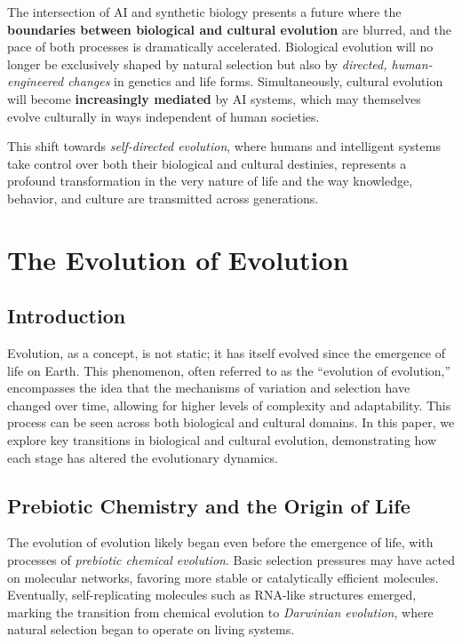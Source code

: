 \documentclass[12pt,titlepage]{book}
\begin{document}
The intersection of AI and synthetic biology presents a future where the \textbf{boundaries between biological and cultural evolution} are blurred, and the pace of both processes is dramatically accelerated. Biological evolution will no longer be exclusively shaped by natural selection but also by \textit{directed, human-engineered changes} in genetics and life forms. Simultaneously, cultural evolution will become \textbf{increasingly mediated} by AI systems, which may themselves evolve culturally in ways independent of human societies.

This shift towards \textit{self-directed evolution}, where humans and intelligent systems take control over both their biological and cultural destinies, represents a profound transformation in the very nature of life and the way knowledge, behavior, and culture are transmitted across generations.


\chapter{The Evolution of Evolution}

\section{Introduction}

Evolution, as a concept, is not static; it has itself evolved since the emergence of life on Earth. This phenomenon, often referred to as the ``evolution of evolution,'' encompasses the idea that the mechanisms of variation and selection have changed over time, allowing for higher levels of complexity and adaptability. This process can be seen across both biological and cultural domains. In this paper, we explore key transitions in biological and cultural evolution, demonstrating how each stage has altered the evolutionary dynamics.

\section{Prebiotic Chemistry and the Origin of Life}

The evolution of evolution likely began even before the emergence of life, with processes of \textit{prebiotic chemical evolution}. Basic selection pressures may have acted on molecular networks, favoring more stable or catalytically efficient molecules. Eventually, self-replicating molecules such as RNA-like structures emerged, marking the transition from chemical evolution to \textit{Darwinian evolution}, where natural selection began to operate on living systems.
\end{document}
